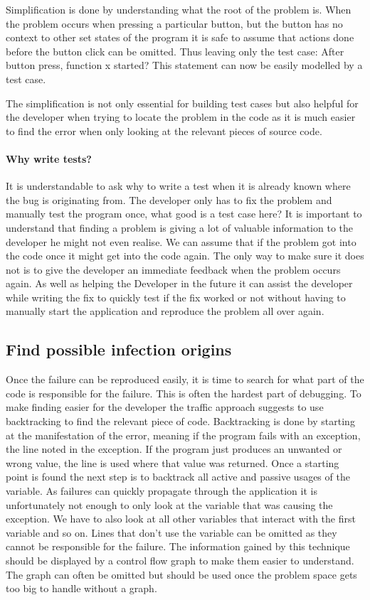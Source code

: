 Simplification is done by understanding what the root of the problem is. When the problem occurs when pressing a particular button, but the button has no context to other set states of the program it is safe to assume that actions done before the button click can be omitted. Thus leaving only the test case: After button press, function x started? This statement can now be easily modelled by a test case.

The simplification is not only essential for building test cases but also helpful for the developer when trying to locate the problem in the code as it is much easier to find the error when only looking at the relevant pieces of source code.

\paragraph{Why write tests?}
It is understandable to ask why to write a test when it is already known where the bug is originating from. The developer only has to fix the problem and manually test the program once, what good is a test case here?
It is important to understand that finding a problem is giving a lot of valuable information to the developer he might not even realise. We can assume that if the problem got into the code once it might get into the code again. The only way to make sure it does not is to give the developer an immediate feedback when the problem occurs again. As well as helping the Developer in the future it can assist the developer while writing the fix to quickly test if the fix worked or not without having to manually start the application and reproduce the problem all over again.



\subsection{Find possible infection origins}
Once the failure can be reproduced easily, it is time to search for what part of the code is responsible for the failure. This is often the hardest part of debugging. To make finding easier for the developer the traffic approach suggests to use backtracking to find the relevant piece of code. Backtracking is done by starting at the manifestation of the error, meaning if the program fails with an exception, the line noted in the exception. If the program just produces an unwanted or wrong value, the line is used where that value was returned. Once a starting point is found the next step is to backtrack all active and passive usages of the variable. As failures can quickly propagate through the application it is unfortunately not enough to only look at the variable that was causing the exception. We have to also look at all other variables that interact with the first variable and so on. Lines that don't use the variable can be omitted as they cannot be responsible for the failure.  The information gained by this technique should be displayed by a control flow graph to make them easier to understand. The graph can often be omitted but should be used once the problem space gets too big to handle without a graph.

